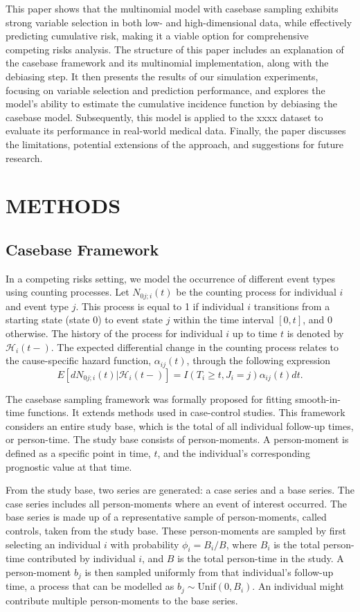 \documentclass[AMA,Times1COL]{WileyNJDv5} %
\begin{document}
This paper shows that the multinomial model with casebase sampling exhibits strong variable selection in both low- and high-dimensional data, while effectively predicting cumulative risk, making it a viable option for comprehensive competing risks analysis. The structure of this paper includes an explanation of the casebase framework and its multinomial implementation, along with the debiasing step. It then presents the results of our simulation experiments, focusing on variable selection and prediction performance, and explores the model's ability to estimate the cumulative incidence function by debiasing the casebase model. Subsequently, this model is applied to the xxxx dataset to evaluate its performance in real-world medical data. Finally, the paper discusses the limitations, potential extensions of the approach, and suggestions for future research. 


\section{METHODS}\label{sec2}

\subsection{Casebase Framework}

In a competing risks setting, we model the occurrence of different event types using counting processes. Let $N_{0j;i}(t)$ be the counting process for individual $i$ and event type $j$. This process is equal to 1 if individual $i$ transitions from a starting state (state 0) to event state $j$ within the time interval $[0, t]$, and 0 otherwise. The history of the process for individual $i$ up to time $t$ is denoted by $\mathcal{H}_{i}(t-)$. The expected differential change in the counting process relates to the cause-specific hazard function, $\alpha_{ij}(t)$, through the following expression
$$E[dN_{0j;i}(t) | \mathcal{H}_{i}(t-)] = I(T_i \ge t, J_i = j) \alpha_{ij}(t)dt.$$

The casebase sampling framework was formally proposed for fitting smooth-in-time functions. It extends methods used in case-control studies. This framework considers an entire study base, which is the total of all individual follow-up times, or person-time. The study base consists of person-moments. A person-moment is defined as a specific point in time, $t$, and the individual's corresponding prognostic value at that time.

From the study base, two series are generated: a case series and a base series. The case series includes all person-moments where an event of interest occurred. The base series is made up of a representative sample of person-moments, called controls, taken from the study base. These person-moments are sampled by first selecting an individual $i$ with probability $\phi_{i}=B_{i}/B$, where $B_{i}$ is the total person-time contributed by individual $i$, and $B$ is the total person-time in the study. A person-moment $b_j$ is then sampled uniformly from that individual's follow-up time, a process that can be modelled as $b_{j}\sim \text{Unif}(0,B_i)$. An individual might contribute multiple person-moments to the base series.
\end{document}
